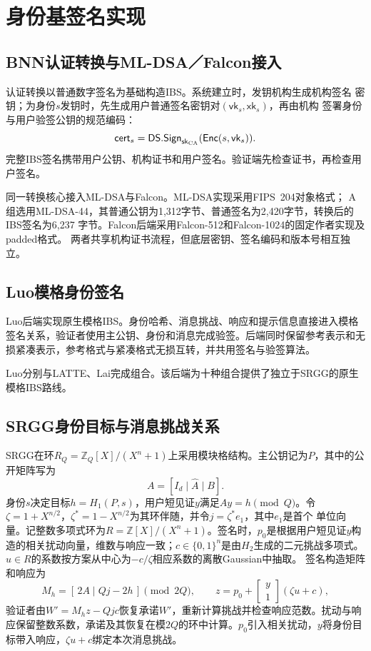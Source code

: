 \section{身份基签名实现}

\subsection{BNN认证转换与ML-DSA／Falcon接入}

认证转换以普通数字签名为基础构造IBS\cite{galindo2006ibs}。系统建立时，发钥机构生成机构签名
密钥；为身份$s$发钥时，先生成用户普通签名密钥对$(\mathsf{vk}_s,\mathsf{xk}_s)$，再由机构
签署身份与用户验签公钥的规范编码：
\[
 \mathsf{cert}_s=\mathsf{DS.Sign}_{\mathsf{sk}_{\rm CA}}
       (\mathsf{Enc}(s,\mathsf{vk}_s)).
\]
完整IBS签名携带用户公钥、机构证书和用户签名。验证端先检查证书，再检查用户签名。

同一转换核心接入ML-DSA与Falcon。ML-DSA实现采用FIPS~204对象格式\cite{nist2024fips204}；
A组选用ML-DSA-44，其普通公钥为1,312字节、普通签名为2,420字节，转换后的IBS签名为6,237
字节。Falcon后端采用Falcon-512和Falcon-1024的固定作者实现及padded格式\cite{falcon2020}。
两者共享机构证书流程，但底层密钥、签名编码和版本号相互独立。

\subsection{Luo模格身份签名}

Luo后端实现原生模格IBS\cite{luo2024ibs}。身份哈希、消息挑战、响应和提示信息直接进入模格
签名关系，验证者使用主公钥、身份和消息完成验签。后端同时保留参考表示和无损紧凑表示，参考格式与紧凑格式无损互转，并共用签名与验签算法。

Luo分别与LATTE、Lai完成组合。该后端为十种组合提供了独立于SRGG的原生模格IBS路线。

\subsection{SRGG身份目标与消息挑战关系}

SRGG在环$R_Q=\mathbb Z_Q[X]/(X^n+1)$上采用模块格结构。主公钥记为$P$，其中的公开矩阵写为
\[
 A=[I_d\mid\widehat A\mid B].
\]
身份$s$决定目标$h=H_1(P,s)$，用户短见证$y$满足$Ay=h\pmod Q$。令
$\zeta=1+X^{n/2}$，$\zeta^*=1-X^{n/2}$为其环伴随，并令$j=\zeta^*e_1$，其中$e_1$是首个
单位向量。记整数多项式环为$R=\mathbb Z[X]/(X^n+1)$。签名时，$p_0$是根据用户短见证$y$构造的相关扰动向量，维数与响应一致；$c\in\{0,1\}^n$是由$H_2$生成的二元挑战多项式。$u\in R$的系数按方案从中心为$-c/\zeta$相应系数的离散Gaussian中抽取。
签名构造矩阵和响应为
\[
 M_h=[\,2A\mid Qj-2h\,]\pmod{2Q},
 \qquad
 z=p_0+\begin{bmatrix}y\\1\end{bmatrix}(\zeta u+c),
\]
验证者由$W'=M_hz-Qjc$恢复承诺$W'$，重新计算挑战并检查响应范数\cite{jia2025ibs}。扰动与响应保留整数系数，承诺及其恢复在模$2Q$的环中计算。$p_0$引入相关扰动，$y$将身份目标带入响应，$\zeta u+c$绑定本次消息挑战。

